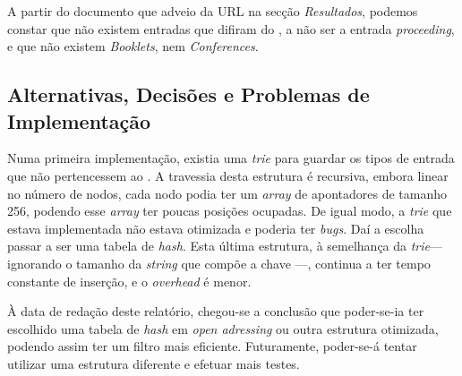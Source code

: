 A partir do documento que adveio da URL na secção \emph{Resultados}, podemos
constar que não existem entradas que difiram do , a não ser
a entrada \emph{proceeding}, e que não existem \emph{Booklets}, nem
\emph{Conferences}. 


\subsection{Alternativas, Decisões e Problemas de Implementação}

Numa primeira implementação, existia uma \emph{trie} para guardar os tipos de
entrada que não pertencessem ao . A travessia desta estrutura
é recursiva, embora linear no número de nodos, cada nodo podia ter um
\emph{array} de apontadores de tamanho 256, podendo esse \emph{array} ter poucas
posições ocupadas. De igual modo, a \emph{trie} que estava implementada não
estava otimizada e poderia ter \emph{bugs}. Daí a escolha passar a ser uma
tabela de \emph{hash}. Esta última estrutura, à semelhança da \emph{trie}---
ignorando o tamanho da \emph{string} que compõe a chave ---, continua a ter
tempo constante de inserção, e o \emph{overhead} é menor.

À data de redação deste relatório, chegou-se a conclusão que poder-se-ia ter
escolhido uma tabela de \emph{hash} em \emph{open adressing} ou outra estrutura
otimizada, podendo assim ter um filtro mais eficiente. Futuramente, poder-se-á
tentar utilizar uma estrutura diferente e efetuar mais testes.


